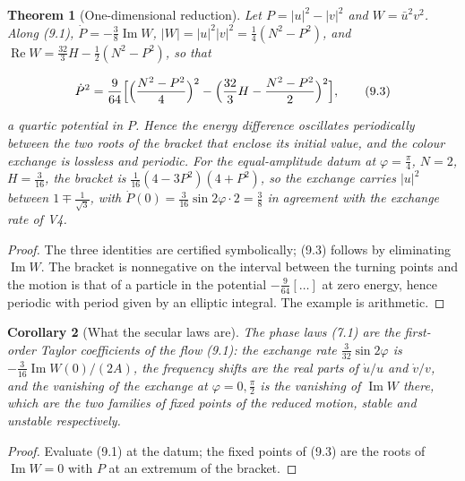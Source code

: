 \documentclass[11pt]{article}
\newtheorem{theorem}{Theorem}[section]
\newtheorem{corollary}[theorem]{Corollary}
\theoremstyle{remark}
\begin{document}
\begin{theorem}[One-dimensional reduction]
\label{thm:v20v6-reduction}
Let \(P=|u|^2-|v|^2\) and \(W=\bar u^2v^2\).  Along (9.1),
\(\dot P=-\tfrac38\operatorname{Im}W\), \(|W|=|u|^2|v|^2=\tfrac14(N^2-P^2)\),
and \(\operatorname{Re}W=\tfrac{32}3H-\tfrac12(N^2-P^2)\), so that

\[
 \dot P^2=\frac9{64}\Bigl[\Bigl(\frac{N^2-P^2}4\Bigr)^2-\Bigl(\frac{32}3H-\frac{N^2-P^2}2\Bigr)^2\Bigr],
                                                                    \tag{9.3}
\]

a quartic potential in \(P\).  Hence the energy difference oscillates
periodically between the two roots of the bracket that enclose its
initial value, and the colour exchange is lossless and periodic.  For
the equal-amplitude datum at \(\varphi=\tfrac\pi4\), \(N=2\),
\(H=\tfrac3{16}\), the bracket is \(\tfrac1{16}(4-3P^2)(4+P^2)\), so the
exchange carries \(|u|^2\) between \(1\mp\tfrac1{\sqrt3}\), with
\(\dot P(0)=\tfrac3{16}\sin2\varphi\cdot2=\tfrac38\) in agreement with
the exchange rate of V4.
\end{theorem}

\begin{proof}
The three identities are certified symbolically; (9.3) follows by
eliminating \(\operatorname{Im}W\).  The bracket is nonnegative on
the interval between the turning points and the motion is that of a
particle in the potential \(-\tfrac9{64}[\dots]\) at zero energy, hence
periodic with period given by an elliptic integral.  The example is
arithmetic.
\end{proof}

\begin{corollary}[What the secular laws are]
\label{cor:v20v6-linearization}
The phase laws (7.1) are the first-order Taylor coefficients of the
flow (9.1): the exchange rate \(\tfrac3{32}\sin2\varphi\) is
\(-\tfrac3{16}\operatorname{Im}W(0)/(2A)\), the frequency shifts are
the real parts of \(\dot u/u\) and \(\dot v/v\), and the vanishing of
the exchange at \(\varphi=0,\tfrac\pi2\) is the vanishing of
\(\operatorname{Im}W\) there, which are the two families of fixed
points of the reduced motion, stable and unstable respectively.
\end{corollary}

\begin{proof}
Evaluate (9.1) at the datum; the fixed points of (9.3) are the roots
of \(\operatorname{Im}W=0\) with \(P\) at an extremum of the bracket.
\end{proof}
\end{document}
